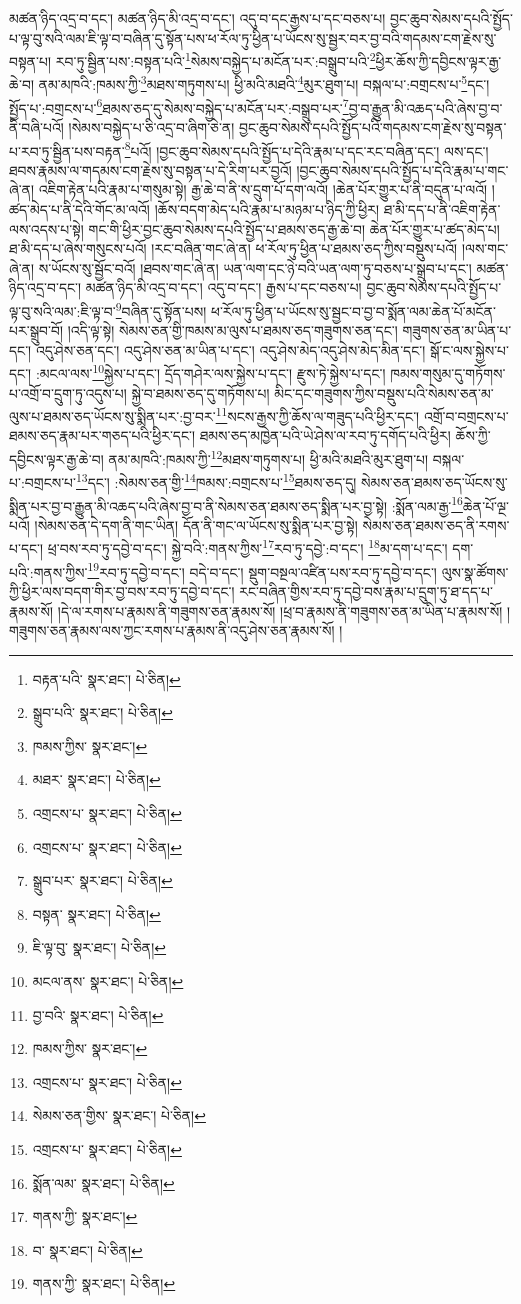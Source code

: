 མཚན་ཉིད་འདྲ་བ་དང་། མཚན་ཉིད་མི་འདྲ་བ་དང་། འདུ་བ་དང་རྒྱས་པ་དང་བཅས་པ། བྱང་ཆུབ་སེམས་དཔའི་སྤྱོད་པ་ལྟ་བུ་སའི་ལམ་ཇི་ལྟ་བ་བཞིན་དུ་སྟོན་པས་ཕ་རོལ་ཏུ་ཕྱིན་པ་ཡོངས་སུ་སྦྱར་བར་བྱ་བའི་གདམས་ངག་རྗེས་སུ་བསྟན་པ། རབ་ཏུ་སྦྱིན་པས་:བསྟན་པའི་\footnote{བརྟན་པའི་  སྣར་ཐང་།  པེ་ཅིན། }སེམས་བསྐྱེད་པ་མངོན་པར་:བསྒྲུབ་པའི་\footnote{སྒྲུབ་པའི་  སྣར་ཐང་།  པེ་ཅིན། }ཕྱིར་ཆོས་ཀྱི་དབྱིངས་ལྟར་རྒྱ་ཆེ་བ། ནམ་མཁའི་:ཁམས་ཀྱི་\footnote{ཁམས་ཀྱིས་  སྣར་ཐང་། }མཐས་གཏུགས་པ། ཕྱི་མའི་མཐའི་\footnote{མཐར་  སྣར་ཐང་།  པེ་ཅིན། }མུར་ཐུག་པ། བསྐལ་པ་:བགྲངས་པ་\footnote{འགྲངས་པ་  སྣར་ཐང་།  པེ་ཅིན། }དང་། སྤྱོད་པ་:བགྲངས་པ་\footnote{འགྲངས་པ་  སྣར་ཐང་།  པེ་ཅིན། }ཐམས་ཅད་དུ་སེམས་བསྐྱེད་པ་མངོན་པར་:བསྒྲུབ་པར་\footnote{སྒྲུབ་པར་  སྣར་ཐང་།  པེ་ཅིན། }བྱ་བ་རྒྱུན་མི་འཆད་པའི་ཞེས་བྱ་བ་ནི་བཞི་པའོ། །སེམས་བསྐྱེད་པ་ཅི་འདྲ་བ་ཞིག་ཅེ་ན། བྱང་ཆུབ་སེམས་དཔའི་སྤྱོད་པའི་གདམས་ངག་རྗེས་སུ་བསྟན་པ་རབ་ཏུ་སྦྱིན་པས་བརྟན་\footnote{བསྟན་  སྣར་ཐང་།  པེ་ཅིན། }པའོ། །བྱང་ཆུབ་སེམས་དཔའི་སྤྱོད་པ་དེའི་རྣམ་པ་དང་རང་བཞིན་དང་། ལས་དང་། ཐབས་རྣམས་ལ་གདམས་ངག་རྗེས་སུ་བསྟན་པ་དེ་རིག་པར་བྱའོ། །བྱང་ཆུབ་སེམས་དཔའི་སྤྱོད་པ་དེའི་རྣམ་པ་གང་ཞེ་ན། འཇིག་རྟེན་པའི་རྣམ་པ་གསུམ་སྟེ། རྒྱ་ཆེ་བ་ནི་ས་དྲུག་པོ་དག་ལའོ། །ཆེན་པོར་གྱུར་པ་ནི་བདུན་པ་ལའོ། །ཚད་མེད་པ་ནི་དེའི་གོང་མ་ལའོ། །ཆོས་བདག་མེད་པའི་རྣམ་པ་མཉམ་པ་ཉིད་ཀྱི་ཕྱིར། ཐ་མི་དད་པ་ནི་འཇིག་རྟེན་ལས་འདས་པ་སྟེ། གང་གི་ཕྱིར་བྱང་ཆུབ་སེམས་དཔའི་སྤྱོད་པ་ཐམས་ཅད་རྒྱ་ཆེ་བ། ཆེན་པོར་གྱུར་པ་ཚད་མེད་པ། ཐ་མི་དད་པ་ཞེས་གསུངས་པའོ། །རང་བཞིན་གང་ཞེ་ན། ཕ་རོལ་ཏུ་ཕྱིན་པ་ཐམས་ཅད་ཀྱིས་བསྡུས་པའོ། །ལས་གང་ཞེ་ན། ས་ཡོངས་སུ་སྦྱོང་བའོ། །ཐབས་གང་ཞེ་ན། ཡན་ལག་དང་ཉེ་བའི་ཡན་ལག་ཏུ་བཅས་པ་སྒྲུབ་པ་དང་། མཚན་ཉིད་འདྲ་བ་དང་། མཚན་ཉིད་མི་འདྲ་བ་དང་། འདུ་བ་དང་། རྒྱས་པ་དང་བཅས་པ། བྱང་ཆུབ་སེམས་དཔའི་སྤྱོད་པ་ལྟ་བུ་སའི་ལམ་:ཇི་ལྟ་བ་\footnote{ཇི་ལྟ་བུ་  སྣར་ཐང་།  པེ་ཅིན། }བཞིན་དུ་སྟོན་པས། ཕ་རོལ་ཏུ་ཕྱིན་པ་ཡོངས་སུ་སྦྱང་བ་བྱ་བ་སྨོན་ལམ་ཆེན་པོ་མངོན་པར་སྒྲུབ་བོ། །འདི་ལྟ་སྟེ། སེམས་ཅན་གྱི་ཁམས་མ་ལུས་པ་ཐམས་ཅད་གཟུགས་ཅན་དང་། གཟུགས་ཅན་མ་ཡིན་པ་དང་། འདུ་ཤེས་ཅན་དང་། འདུ་ཤེས་ཅན་མ་ཡིན་པ་དང་། འདུ་ཤེས་མེད་འདུ་ཤེས་མེད་མིན་དང་། སྒོ་ང་ལས་སྐྱེས་པ་དང་། :མངལ་ལས་\footnote{མངལ་ནས་  སྣར་ཐང་།  པེ་ཅིན། }སྐྱེས་པ་དང་། དྲོད་གཤེར་ལས་སྐྱེས་པ་དང་། རྫུས་ཏེ་སྐྱེས་པ་དང་། ཁམས་གསུམ་དུ་གཏོགས་པ་འགྲོ་བ་དྲུག་ཏུ་འདུས་པ། སྐྱེ་བ་ཐམས་ཅད་དུ་གཏོགས་པ། མིང་དང་གཟུགས་ཀྱིས་བསྡུས་པའི་སེམས་ཅན་མ་ལུས་པ་ཐམས་ཅད་ཡོངས་སུ་སྨིན་པར་:བྱ་བར་\footnote{བྱ་བའི་  སྣར་ཐང་།  པེ་ཅིན། }སངས་རྒྱས་ཀྱི་ཆོས་ལ་གཟུད་པའི་ཕྱིར་དང་། འགྲོ་བ་བགྲངས་པ་ཐམས་ཅད་རྣམ་པར་གཅད་པའི་ཕྱིར་དང་། ཐམས་ཅད་མཁྱེན་པའི་ཡེ་ཤེས་ལ་རབ་ཏུ་དགོད་པའི་ཕྱིར། ཆོས་ཀྱི་དབྱིངས་ལྟར་རྒྱ་ཆེ་བ། ནམ་མཁའི་:ཁམས་ཀྱི་\footnote{ཁམས་ཀྱིས་  སྣར་ཐང་། }མཐས་གཏུགས་པ། ཕྱི་མའི་མཐའི་མུར་ཐུག་པ། བསྐལ་པ་:བགྲངས་པ་\footnote{འགྲངས་པ་  སྣར་ཐང་།  པེ་ཅིན། }དང་། :སེམས་ཅན་གྱི་\footnote{སེམས་ཅན་གྱིས་  སྣར་ཐང་།  པེ་ཅིན། }ཁམས་:བགྲངས་པ་\footnote{འགྲངས་པ་  སྣར་ཐང་།  པེ་ཅིན། }ཐམས་ཅད་དུ། སེམས་ཅན་ཐམས་ཅད་ཡོངས་སུ་སྨིན་པར་བྱ་བ་རྒྱུན་མི་འཆད་པའི་ཞེས་བྱ་བ་ནི་སེམས་ཅན་ཐམས་ཅད་སྨིན་པར་བྱ་སྟེ། :སྨོན་ལམ་རྒྱ་\footnote{སྨོན་ལམ་  སྣར་ཐང་།  པེ་ཅིན། }ཆེན་པོ་ལྔ་པའོ། །སེམས་ཅན་དེ་དག་ནི་གང་ཡིན། དོན་ནི་གང་ལ་ཡོངས་སུ་སྨིན་པར་བྱ་སྟེ། སེམས་ཅན་ཐམས་ཅད་ནི་རགས་པ་དང་། ཕྲ་བས་རབ་ཏུ་དབྱེ་བ་དང་། སྐྱེ་བའི་:གནས་ཀྱིས་\footnote{གནས་ཀྱི་  སྣར་ཐང་། }རབ་ཏུ་དབྱེ་:བ་དང་། \footnote{བ་  སྣར་ཐང་།  པེ་ཅིན། }མ་དག་པ་དང་། དག་པའི་:གནས་ཀྱིས་\footnote{གནས་ཀྱི་  སྣར་ཐང་།  པེ་ཅིན། }རབ་ཏུ་དབྱེ་བ་དང་། བདེ་བ་དང་། སྡུག་བསྔལ་འཛིན་པས་རབ་ཏུ་དབྱེ་བ་དང་། ལུས་སྣ་ཚོགས་ཀྱི་ཕྱིར་ལས་བདག་གིར་བྱ་བས་རབ་ཏུ་དབྱེ་བ་དང་། རང་བཞིན་གྱིས་རབ་ཏུ་དབྱེ་བས་རྣམ་པ་དྲུག་ཏུ་ཐ་དད་པ་རྣམས་སོ། །དེ་ལ་རགས་པ་རྣམས་ནི་གཟུགས་ཅན་རྣམས་སོ། །ཕྲ་བ་རྣམས་ནི་གཟུགས་ཅན་མ་ཡིན་པ་རྣམས་སོ། །གཟུགས་ཅན་རྣམས་ལས་ཀྱང་རགས་པ་རྣམས་ནི་འདུ་ཤེས་ཅན་རྣམས་སོ། །
